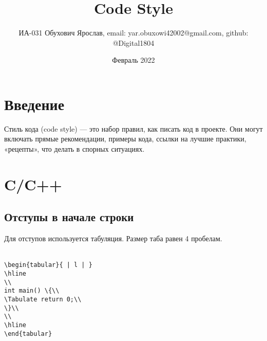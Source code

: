 \documentclass{article}
\title{Code Style}
\author{ИА-031 Обухович Ярослав, email: yar.obuxowi42002@gmail.com,  github: @Digital1804}
\date{Февраль 2022}
\begin{document}
\maketitle

\section{Введение}
Стиль кода (code style) — это набор правил, как писать код в проекте. Они могут включать прямые рекомендации, примеры кода, ссылки на лучшие практики, «рецепты», что делать в спорных ситуациях. \cite{one}

\section{C/C++}
\subsection{Отступы в начале строки}

Для отступов используется табуляция. Размер таба равен 4 пробелам.\\\\
\newcommand*{\Tabulate}{\hspace*{0.5cm}}
\begin{lstlisting}
\begin{tabular}{ | l | }
\hline
\\
int main() \{\\
\Tabulate return 0;\\
\}\\
\\
\hline
\end{tabular}
\end{lstlisting}
\end{document}
